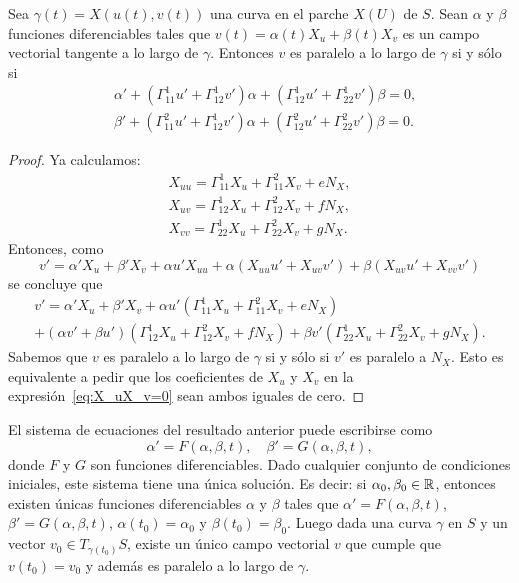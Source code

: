 \begin{proposition}
	Sea $\gamma(t)=X(u(t),v(t))$ una curva en el parche $X(U)$ de $S$. Sean
	$\alpha$ y $\beta$ funciones diferenciables tales que
	$v(t)=\alpha(t)X_u+\beta(t)X_v$ es un campo vectorial tangente a lo largo
	de $\gamma$. Entonces $v$ es paralelo a lo largo de $\gamma$ si y sólo si 
	\begin{align*}
		&\alpha'+(\Gamma_{11}^1 u'+\Gamma_{12}^1v')\alpha+(\Gamma_{12}^1u'+\Gamma_{22}^1v')\beta=0,\\
		&\beta'+(\Gamma_{11}^2 u'+\Gamma_{12}^1v')\alpha+(\Gamma_{12}^2u'+\Gamma_{22}^2v')\beta=0.
	\end{align*}
\end{proposition}

\begin{proof}
	Ya calculamos:
	\begin{align*}
		X_{uu}=\Gamma_{11}^1 X_u+\Gamma_{11}^2X_v+eN_X,\\
		X_{uv}=\Gamma_{12}^1 X_u+\Gamma_{12}^2X_v+fN_X,\\
		X_{vv}=\Gamma_{22}^1 X_u+\Gamma_{22}^2X_v+gN_X.
	\end{align*}
	Entonces, como
	\[
		v'=\alpha'X_u+\beta'X_v+\alpha u'X_{uu}+\alpha(X_{uu}u'+X_{uv}v')+\beta(X_{uv}u'+X_{vv}v')
	\]
	se concluye que	
	\begin{multline}
		\label{eq:X_uX_v=0}
		v'=\alpha'X_u+\beta'X_v+\alpha u'(\Gamma_{11}^1X_u+\Gamma_{11}^2X_v+eN_X)\\
		+(\alpha v'+\beta u')(\Gamma_{12}^1X_u+\Gamma_{12}^2X_v+fN_X)
		+\beta v'(\Gamma_{22}^1X_u+\Gamma_{22}^2X_v+gN_X).
	\end{multline}
	Sabemos que $v$ es paralelo a lo largo de $\gamma$ si y sólo si $v'$ es
	paralelo a $N_X$. Esto es equivalente a pedir que los coeficientes de $X_u$
	y $X_v$ en la expresión~\eqref{eq:X_uX_v=0} sean ambos iguales de cero. 
\end{proof}

El sistema de ecuaciones del 
resultado anterior puede escribirse
como
\[
	\alpha'=F(\alpha,\beta,t),\quad
	\beta'=G(\alpha,\beta,t),
\]
donde $F$ y $G$ son funciones diferenciables. Dado cualquier conjunto de
condiciones iniciales, este sistema tiene una única solución. Es decir: si
$\alpha_0,\beta_0\in\mathbb{R}$, entonces existen únicas funciones diferenciables
$\alpha$ y  $\beta$ tales que $\alpha'=F(\alpha,\beta,t)$,
$\beta'=G(\alpha,\beta,t)$, $\alpha(t_0)=\alpha_0$ y $\beta(t_0)=\beta_0$. Luego 
dada una curva $\gamma$ en $S$ y un vector $v_0\in T_{\gamma(t_0)}S$, existe un 
único campo vectorial $v$ que cumple que $v(t_0)=v_0$ y además 
es paralelo a lo largo de $\gamma$.

